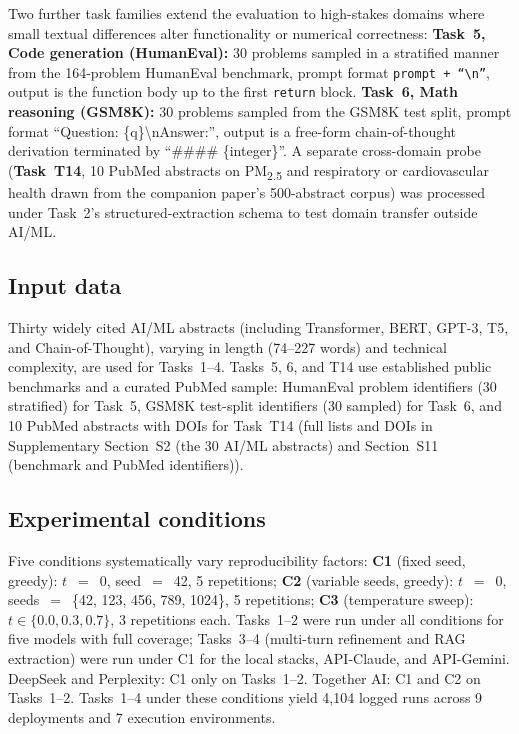\documentclass[sn-nature]{sn-jnl}
\begin{document}
Two further task families extend the evaluation to high-stakes domains where small textual differences alter functionality or numerical correctness:
\textbf{Task~5, Code generation (HumanEval):} 30 problems sampled in a stratified manner from the 164-problem HumanEval benchmark\cite{chen2021humaneval}, prompt format \texttt{prompt + ``\textbackslash n''}, output is the function body up to the first \texttt{return} block.
\textbf{Task~6, Math reasoning (GSM8K):} 30 problems sampled from the GSM8K test split\cite{cobbe2021gsm8k}, prompt format ``Question: \{q\}\textbackslash nAnswer:'', output is a free-form chain-of-thought derivation terminated by ``\#\#\#\# \{integer\}''.
A separate cross-domain probe (\textbf{Task~T14}, 10 PubMed abstracts on PM\textsubscript{2.5} and respiratory or cardiovascular health drawn from the companion paper's 500-abstract corpus\cite{rover2026evidence}) was processed under Task~2's structured-extraction schema to test domain transfer outside AI/ML.


\subsection{Input data}\label{subsec:input}

Thirty widely cited AI/ML abstracts (including Transformer, BERT, GPT-3, T5, and Chain-of-Thought\cite{vaswani2017attention,devlin2019bert,brown2020language,raffel2020exploring,wei2022chain}), varying in length (74--227 words) and technical complexity, are used for Tasks~1--4.
Tasks~5, 6, and T14 use established public benchmarks and a curated PubMed sample:
HumanEval problem identifiers (30 stratified) for Task~5, GSM8K test-split identifiers (30 sampled) for Task~6, and 10 PubMed abstracts with DOIs for Task~T14 (full lists and DOIs in Supplementary Section~S2 (the 30 AI/ML abstracts) and Section~S11 (benchmark and PubMed identifiers)).


\subsection{Experimental conditions}\label{subsec:conditions}

Five conditions systematically vary reproducibility factors:
\textbf{C1} (fixed seed, greedy): $t$~$=$~0, seed~$=$~42, 5 repetitions;
\textbf{C2} (variable seeds, greedy): $t$~$=$~0, seeds~$=$~\{42, 123, 456, 789, 1024\}, 5 repetitions;
\textbf{C3} (temperature sweep): $t \in \{0.0, 0.3, 0.7\}$, 3 repetitions each.
Tasks~1--2 were run under all conditions for five models with full coverage; Tasks~3--4 (multi-turn refinement and RAG extraction) were run under C1 for the local stacks, API-Claude, and API-Gemini.
DeepSeek and Perplexity: C1 only on Tasks~1--2.
Together AI: C1 and C2 on Tasks~1--2.
Tasks~1--4 under these conditions yield 4{,}104 logged runs across 9 deployments and 7 execution environments.
\end{document}
